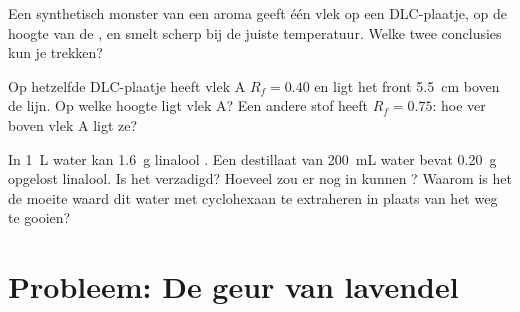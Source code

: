 \begin{exercise}[$\star\star\star$]\label{exo:g10:chemical-species:13}
Een synthetisch monster van een aroma geeft één vlek op een
DLC-plaatje, op de hoogte van de , en smelt scherp bij
de juiste temperatuur. Welke twee conclusies kun je trekken?
\end{exercise}

\begin{exercise}[$\star\star\star$]\label{exo:g10:chemical-species:14}
Op hetzelfde DLC-plaatje heeft vlek A $R_f = 0.40$ en ligt het front
\qty{5.5}{cm} boven de lijn. Op welke hoogte ligt vlek A? Een andere stof
heeft $R_f = 0.75$: hoe ver boven vlek A ligt ze?
\end{exercise}

\begin{exercise}[$\star\star\star$]\label{exo:g10:chemical-species:15}
In \qty{1}{L} water kan \qty{1.6}{g} linalool . Een destillaat
van \qty{200}{mL} water bevat \qty{0.20}{g} opgelost linalool. Is het
verzadigd? Hoeveel zou er nog in kunnen ? Waarom is het de moeite
waard dit water met cyclohexaan te extraheren in plaats van het weg te
gooien?
\end{exercise}

\clearpage %
\section{Probleem: De geur van lavendel}

